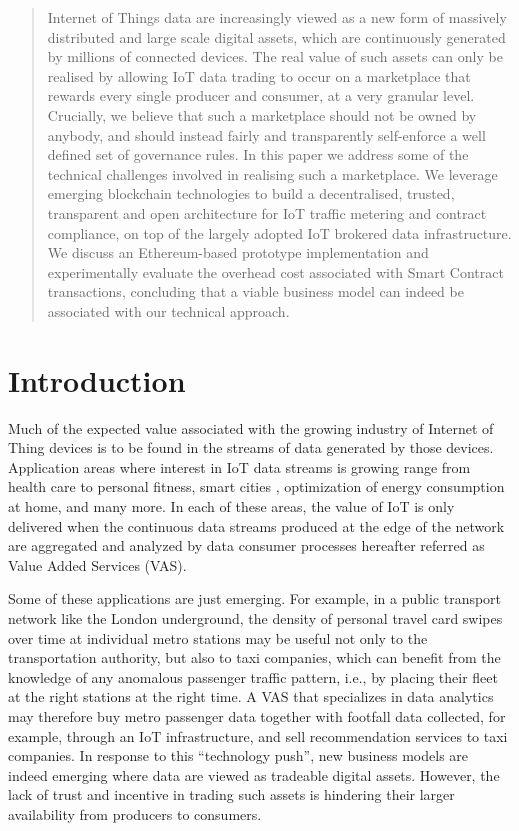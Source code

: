 \documentclass[chi_draft]{sigchi}
\begin{document}
\begin{abstract}
Internet of Things data are increasingly viewed as a new form of massively distributed and large scale digital assets, which are continuously generated by millions of connected devices.
The real value of such assets can only be realised by allowing IoT data trading to occur on a marketplace that rewards every single producer and consumer, at a very granular level.
Crucially, we believe that such a marketplace should not be owned by anybody, and should instead fairly and transparently self-enforce a well defined set of governance rules.
In this paper we address some of the technical challenges involved in realising such a marketplace.
We leverage emerging blockchain technologies to build a decentralised, trusted, transparent and open architecture for IoT traffic metering and contract compliance, on top of the largely adopted IoT brokered data infrastructure.
We discuss an Ethereum-based prototype implementation and experimentally evaluate the overhead cost associated with Smart Contract transactions, concluding that a viable business model can indeed be associated with our technical approach.
\end{abstract}

\section{Introduction}
Much of the expected value associated with the growing industry of Internet of Thing devices \cite{7004800} is to be found in the streams of data generated by those devices.
Application areas where interest in IoT data streams is growing range from health care \cite{7113786} to personal fitness, smart cities \cite{Perera2014}, optimization of energy consumption at home, and many more.
In each of these areas, the value of IoT is only delivered when the continuous data streams produced at the edge of the network are aggregated and analyzed by data consumer processes hereafter referred as Value Added Services (VAS).

Some of these applications are just emerging.
For example, in a public transport network like the London underground, the density of personal travel card swipes over time at individual metro stations may be
useful not only to the transportation authority, but also to taxi companies, which can benefit from the knowledge of any anomalous passenger traffic pattern, i.e., by placing their fleet at the right stations at the right time. A VAS that specializes in data analytics may therefore buy metro passenger data together with footfall data collected, for example, through an IoT infrastructure, and sell
recommendation services to taxi companies.
In response to this ``technology push'', new business models are indeed emerging \cite{Stahl2016,7765669} where data are viewed as tradeable digital assets. However, the lack of trust and  incentive in trading such assets is hindering their larger availability from producers to consumers.
\end{document}
